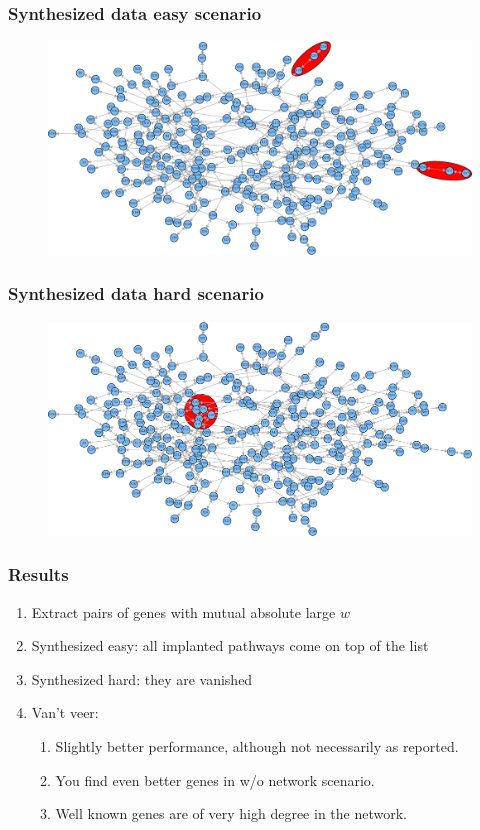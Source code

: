 \documentclass{beamer}
\begin{document}
\begin{frame}[plain]
\frametitle{Synthesized data easy scenario}
\begin{figure}
\includegraphics[scale=0.25]{synthesized-graph-easy} 
\end{figure}
\end{frame}

\begin{frame}[plain]
\frametitle{Synthesized data hard scenario}
\begin{figure}
\includegraphics[scale=0.25]{synthesized-graph-hard}
\end{figure}
\end{frame}

\begin{frame}
\frametitle{Results}
\begin{enumerate}
\item Extract pairs of genes with mutual absolute large $w$ 
\item Synthesized easy: all implanted pathways come on top of the list 
\item Synthesized hard: they are vanished \pause
\item Van't veer: 
  \begin{enumerate}
    \item Slightly better performance, although not necessarily as reported.
    \item You find even better genes in w/o network scenario.
    \item Well known genes are of very high degree in the network.
  \end{enumerate}
\end{enumerate}
\end{frame}
\end{document}
